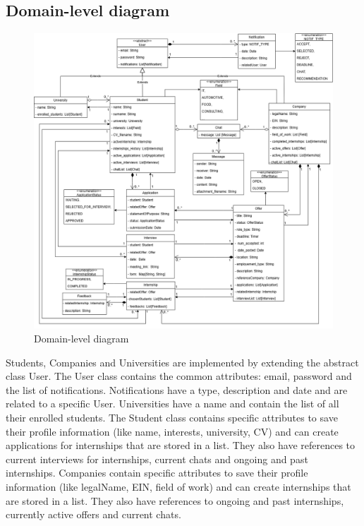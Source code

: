 \subsection{Domain-level diagram}\label{subsec:domain_level_diagram}
\begin{figure}[H]
    \centering
    \includegraphics[width=1\textwidth]{Images/UML_Class_diagram.png}
    \caption{Domain-level diagram}\label{fig:domain-lebel_diagram}
\end{figure}
Students, Companies and Universities are implemented by extending the abstract class User. The User class contains the common attributes: email, password and
the list of notifications. Notifications have a type, description and date and are related to a specific User. Universities have a name and contain the list 
of all their enrolled students. The Student class contains specific attributes to save their profile information (like name, interests, university, CV) and 
can create applications for internships that are stored in a list. They also have references to current interviews for internships, current chats and ongoing 
and past internships. Companies contain specific attributes to save their profile information (like legalName, EIN, field of work) and can create internships 
that are stored in a list. They also have references to ongoing and past internships, currently active offers and current chats. \\
